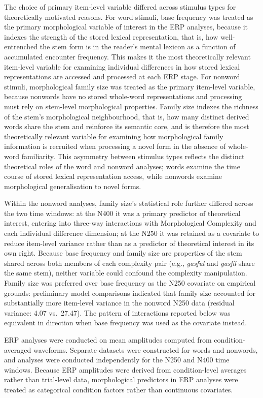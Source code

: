 \documentclass[utf8]{FrontiersinHarvard} %
\begin{document}
	The choice of primary item-level variable differed across stimulus types for theoretically motivated reasons. For word stimuli, base frequency was treated as the primary morphological variable of interest in the ERP analyses, because it indexes the strength of the stored lexical representation, that is, how well-entrenched the stem form is in the reader's mental lexicon as a function of accumulated encounter frequency. This makes it the most theoretically relevant item-level variable for examining individual differences in how stored lexical representations are accessed and processed at each ERP stage. For nonword stimuli, morphological family size was treated as the primary item-level variable, because nonwords have no stored whole-word representations and processing must rely on stem-level morphological properties. Family size indexes the richness of the stem's morphological neighbourhood, that is, how many distinct derived words share the stem and reinforce its semantic core, and is therefore the most theoretically relevant variable for examining how morphological family information is recruited when processing a novel form in the absence of whole-word familiarity. This asymmetry between stimulus types reflects the distinct theoretical roles of the word and nonword analyses; words examine the time course of stored lexical representation access, while nonwords examine morphological generalisation to novel forms.
	
	Within the nonword analyses, family size's statistical role further differed across the two time windows: at the N400 it was a primary predictor of theoretical interest, entering into three-way interactions with Morphological Complexity and each individual difference dimension; at the N250 it was retained as a covariate to reduce item-level variance rather than as a predictor of theoretical interest in its own right. Because base frequency and family size are properties of the stem shared across both members of each complexity pair (e.g., \textit{gasful} and \textit{gasfil} share the same stem), neither variable could confound the complexity manipulation. Family size was preferred over base frequency as the N250 covariate on empirical grounds: preliminary model comparisons indicated that family size accounted for substantially more item-level variance in the nonword N250 data (residual variance: 4.07 vs.\ 27.47). The pattern of interactions reported below was equivalent in direction when base frequency was used as the covariate instead.
	
	ERP analyses were conducted on mean amplitudes computed from condition-averaged waveforms. Separate datasets were constructed for words and nonwords, and analyses were conducted independently for the N250 and N400 time windows. Because ERP amplitudes were derived from condition-level averages rather than trial-level data, morphological predictors in ERP analyses were treated as categorical condition factors rather than continuous covariates.
	
\end{document}
